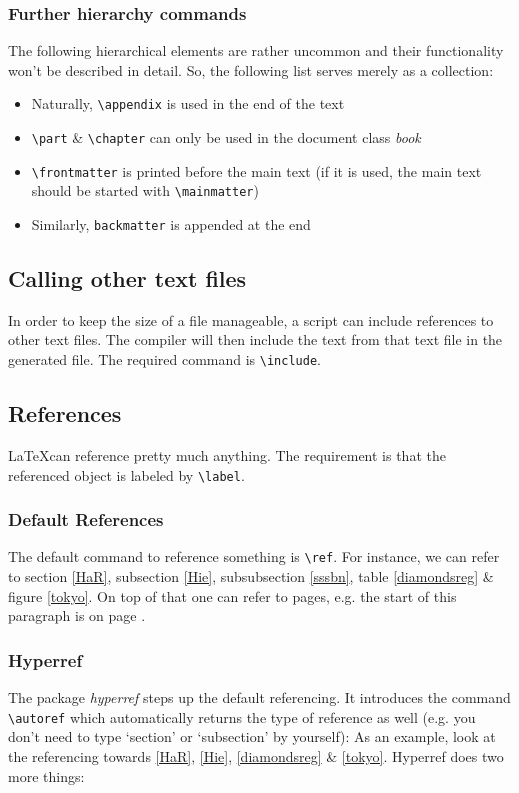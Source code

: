 \documentclass[a4paper]{scrartcl}
\begin{document}
	\subsubsection{Further hierarchy commands}
	The following hierarchical elements are rather uncommon and their functionality won't be described in detail. So, the following list serves merely as a collection:
	
	\begin{itemize}
		\item Naturally, \texttt{\textbackslash appendix} is used in the end of the text
		\item \texttt{\textbackslash part} \& \texttt{\textbackslash chapter} can only be used in the document class \emph{book}
		\item \texttt{\textbackslash frontmatter} is printed before the main text (if it is used, the main text should be started with \texttt{\textbackslash mainmatter})
		\item Similarly, \texttt{backmatter} is appended at the end
	\end{itemize}

\subsection{Calling other text files}
	In order to keep the size of a file manageable, a script can include references to other text files. The compiler will then include the text from that text file in the generated file. The required command is \texttt{\textbackslash include}. 

\subsection{References}
	\LaTeX \space can reference pretty much anything. The requirement is that the referenced object is labeled by \texttt{\textbackslash label}.
	
	\subsubsection{Default References}\label{dr}
	The default command to reference something is \texttt{\textbackslash ref}. For instance, we can refer to section \ref{HaR}, subsection \ref{Hie}, subsubsection \ref{sssbn}, table \ref{diamondsreg} \& figure \ref{tokyo}. On top of that one can refer to pages, e.g. the start of this paragraph is on page \pageref{dr}.
	
	\subsubsection{Hyperref}
	The package \emph{hyperref} steps up the default referencing. It introduces the command \texttt{\textbackslash autoref} which automatically returns the type of reference as well (e.g. you don't need to type `section' or `subsection' by yourself): As an example, look at the referencing towards \autoref{HaR}, \autoref{Hie}, \autoref{diamondsreg} \& \autoref{tokyo}.
	Hyperref does two more things:
	
\end{document}
